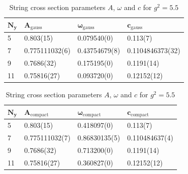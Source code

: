 \begin{table}[!hb]
\centering
\begin{tabular}{llll}
    $\mathbf{N_y}$ & $\mathbf{A_\mathrm{gauss}}$ & $\mathbf{\omega_\mathrm{gauss}}$ & $\mathbf{c_\mathrm{gauss}}$ \\ \hline
   5 & 0.803(15) & 0.079540(0) & 0.113(7) \\
   7 & 0.775111032(6) & 0.43754679(8) & 0.1104846373(32) \\
   9 & 0.7686(32) & 0.175195(0) & 0.1191(14) \\
   11 & 0.75816(27) & 0.093720(0) & 0.12152(12) \\
\end{tabular}
\begin{tabular}{llll}
    $\mathbf{N_y}$ & $\mathbf{A_\mathrm{compact}}$ & $\mathbf{\omega_\mathrm{compact}}$ & $\mathbf{c_\mathrm{compact}}$ \\ \hline
   5 & 0.803(15) & 0.418097(0) & 0.113(7) \\
   7 & 0.775111032(7) & 0.86830135(5) & 0.110484637(4) \\
   9 & 0.7686(32) & 0.713200(0) & 0.1191(14) \\
   11 & 0.75816(27) & 0.360827(0) & 0.12152(12) \\
\end{tabular}
\caption{String cross section parameters $A$, $\omega$ and $c$ for $g^2=5.5$}
\end{table}
